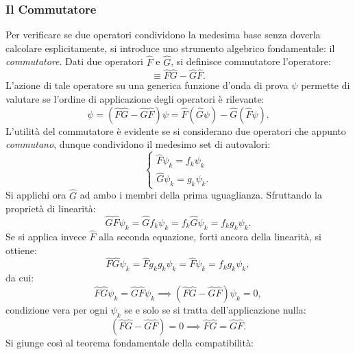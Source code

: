 \documentclass[a4paper,11pt]{report}
\begin{document}
\subsubsection{Il Commutatore}
Per verificare se due operatori condividono la medesima base senza doverla calcolare esplicitamente, si introduce uno strumento algebrico fondamentale: il \textit{commutatore}.
Dati due operatori $\hat{F}$ e $\hat{G}$, si definisce commutatore l'operatore:
\begin{equation}
    [\hat{F}, \hat{G}] \equiv \hat{F}\hat{G} - \hat{G}\hat{F}.
\end{equation}
L'azione di tale operatore su una generica funzione d'onda di prova $\psi$ permette di valutare se l'ordine di applicazione degli operatori è rilevante:
\begin{equation}
    [\hat{F}, \hat{G}]\psi = (\hat{F}\hat{G} - \hat{G}\hat{F})\psi = \hat{F}(\hat{G}\psi) - \hat{G}(\hat{F}\psi).
\end{equation}
L'utilità del commutatore è evidente se si considerano due operatori che appunto \textit{commutano}, dunque condividono il medesimo set di autovalori:
\begin{equation}
    \begin{cases}
        \hat{F}\psi_k = f_k \psi_k \\
        \hat{G}\psi_k = g_k \psi_k.
    \end{cases}
\end{equation}
Si applichi ora $\hat{G}$ ad ambo i membri della prima uguaglianza. Sfruttando la proprietà di linearità:
\begin{equation}
    \hat{G}\hat{F}\psi_k = \hat{G}f_k \psi_k = f_k\hat{G} \psi_k = f_k g_k \psi_k.
\end{equation}
Se si applica invece $\hat{F}$ alla seconda equazione, forti ancora della linearità, si ottiene:
\begin{equation}
    \hat{F}\hat{G}\psi_k = \hat{F}g_k g_k\psi_k = \hat{F} \psi_k = f_k g_k \psi_k,
\end{equation}
da cui:
\begin{equation}
    \hat{F}\hat{G}\psi_k = \hat{G}\hat{F}\psi_k \implies (\hat{F}\hat{G} - \hat{G}\hat{F})\psi_k = 0,
\end{equation}
condizione vera per ogni $\psi_k$ se e solo se si tratta dell'applicazione nulla:
\begin{equation}
(\hat{F}\hat{G} - \hat{G}\hat{F}) = 0 \implies \hat{F}\hat{G} = \hat{G}\hat{F}.
\end{equation}
Si giunge così al teorema fondamentale della compatibilità:
\end{document}
